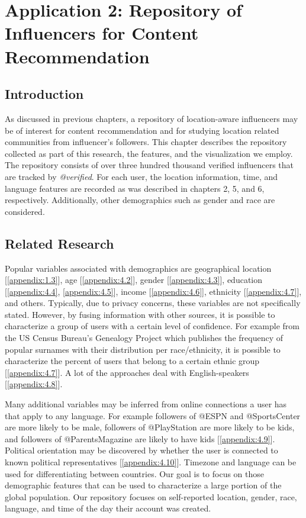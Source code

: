 \chapter{Application 2: Repository of Influencers for Content Recommendation}\label{chap:ch7}
\section{Introduction}

As discussed in previous chapters, a repository of location-aware influencers may be of interest for content recommendation and for studying location related communities from influencer's followers. This chapter describes the repository collected as part of this research, the features, and the visualization we employ. The repository consists of over three hundred thousand verified influencers that are tracked by \emph{@verified}. For each user, the location information, time, and language features are recorded as was described in chapters 2, 5, and 6, respectively. Additionally, other demographics such as gender and race are considered. %

\section{Related Research}
Popular variables associated with demographics are geographical location [\ref{appendix:1.3}], age [\ref{appendix:4.2}], gender [\ref{appendix:4.3}], education [\ref{appendix:4.4}, \ref{appendix:4.5}], income [\ref{appendix:4.6}], ethnicity [\ref{appendix:4.7}], and others. Typically, due to privacy concerns, these variables are not specifically stated. However, by fusing information with other sources, it is possible to characterize a group of users with a certain level of confidence. For example from the US Census Bureau's Genealogy Project which publishes the frequency of popular surnames with their distribution per race/ethnicity, it is possible to characterize the percent of users that belong to a certain ethnic group [\ref{appendix:4.7}]. A lot of the approaches deal with English-speakers [\ref{appendix:4.8}].

Many additional variables may be inferred from online connections a user has that apply to any language. For example followers of @ESPN and @SportsCenter are more likely to be male, followers of @PlayStation are more likely to be kids, and followers of @ParentsMagazine are likely to have kids [\ref{appendix:4.9}]. Political orientation may be discovered by whether the user is connected to known political representatives [\ref{appendix:4.10}]. Timezone and language can be used for differentiating between countries. Our goal is to focus on those demographic features that can be used to characterize a large portion of the global population. Our repository focuses on self-reported location, gender, race, language, and time of the day their account was created. 

